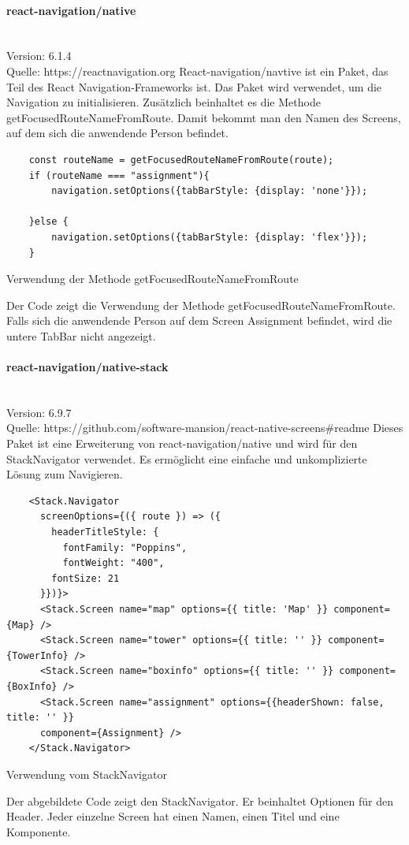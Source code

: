 \paragraph{react-navigation/native}\mbox{}\\
Version: 6.1.4\\
Quelle: https://reactnavigation.org
\bigskip
React-navigation/navtive ist ein Paket, das Teil des React Navigation-\Gls{Framework}s ist. Das Paket wird verwendet, um die Navigation zu initialisieren. Zusätzlich beinhaltet es die Methode getFocusedRouteNameFromRoute. Damit bekommt man den Namen des Screens, auf dem sich die anwendende Person befindet.
\begin{listing}[H]
  \begin{verbatim}
    const routeName = getFocusedRouteNameFromRoute(route);
    if (routeName === "assignment"){
        navigation.setOptions({tabBarStyle: {display: 'none'}});
        
    }else {
        navigation.setOptions({tabBarStyle: {display: 'flex'}});
    }
\end{verbatim}
  \caption{Verwendung der Methode getFocusedRouteNameFromRoute}
  \label{lst:getfocusedroutename}
\end{listing}
Der Code zeigt die Verwendung der Methode getFocusedRouteNameFromRoute. Falls sich die anwendende Person auf dem Screen Assignment befindet, wird die untere TabBar nicht angezeigt.


\paragraph{react-navigation/native-stack}\mbox{}\\
Version: 6.9.7\\
Quelle: https://github.com/software-mansion/react-native-screens\#readme
\bigskip
Dieses Paket ist eine Erweiterung von react-navigation/native und wird für den StackNavigator verwendet. Es ermöglicht eine einfache und unkomplizierte Lösung zum Navigieren.
\begin{listing}[H]
  \begin{verbatim}
    <Stack.Navigator
      screenOptions={({ route }) => ({ 
        headerTitleStyle: {
          fontFamily: "Poppins",
          fontWeight: "400",
        fontSize: 21
      }})}>
      <Stack.Screen name="map" options={{ title: 'Map' }} component={Map} />
      <Stack.Screen name="tower" options={{ title: '' }} component={TowerInfo} />
      <Stack.Screen name="boxinfo" options={{ title: '' }} component={BoxInfo} />
      <Stack.Screen name="assignment" options={{headerShown: false, title: '' }} 
      component={Assignment} />
    </Stack.Navigator>
\end{verbatim}
  \caption{Verwendung vom StackNavigator}
  \label{lst:stacknavigator}
\end{listing}
Der abgebildete Code zeigt den StackNavigator. Er beinhaltet Optionen für den Header. Jeder einzelne Screen hat einen Namen, einen Titel und eine Komponente.



